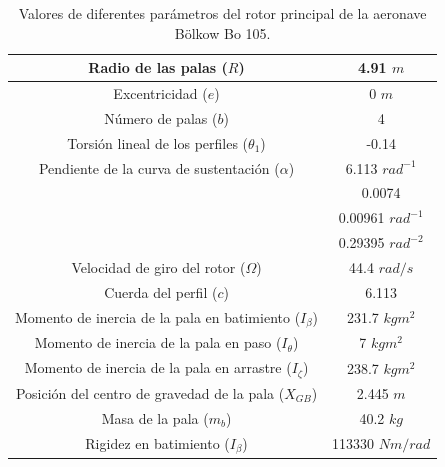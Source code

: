 \begin{table}[htbp]
	\centering
	\begin{tabular}{|>{\columncolor{Gray}}c|c|}
		\hline
		\cellcolor{Gray}Radio de las palas ($R$) & \cellcolor[rgb]{ 1,  1,  1}4.91 $m$ \\ \hline
		\cellcolor{Gray}Excentricidad ($e$)& \cellcolor[rgb]{ 1,  1,  1}0 $m$ \\ \hline
		\cellcolor{Gray}Número de palas ($b$) & \cellcolor[rgb]{ 1,  1,  1}4 \\ \hline
		\cellcolor{Gray}Torsión lineal de los perfiles ($\theta_1$) & \cellcolor[rgb]{ 1,  1,  1}-0.14 \\ \hline
		\cellcolor{Gray}Pendiente de la curva de sustentación ($\alpha$) & \cellcolor[rgb]{ 1,  1,  1}6.113 $rad^{-1}$ \\ \hline
		\cellcolor{Gray} & \cellcolor[rgb]{ 1,  1,  1}0.0074 \\ \hhline{|~|-|}
		\cellcolor{Gray} & \cellcolor[rgb]{ 1,  1,  1}0.00961 $rad^{-1}$ \\ \hhline{|~|-|}
		\multirow{-3}{*}{\cellcolor{Gray}Parámetros de la polar ($\delta_0$, $\delta_1$, $\delta_2$)} & \cellcolor[rgb]{ 1,  1,  1}0.29395 $rad^{-2}$ \\ \hline
		\cellcolor{Gray}Velocidad de giro del rotor ($\Omega$) & \cellcolor[rgb]{ 1,  1,  1}44.4 $rad/s$ \\ \hline
		\cellcolor{Gray}Cuerda del perfil ($c$) & \cellcolor[rgb]{ 1,  1,  1}6.113 \\ \hline
		\cellcolor{Gray}Momento de inercia de la pala en batimiento ($I_\beta$) & \cellcolor[rgb]{ 1,  1,  1}231.7 $kgm^2$ \\ \hline
		\cellcolor{Gray}Momento de inercia de la pala en paso ($I_\theta$) & \cellcolor[rgb]{ 1,  1,  1}7 $kgm^2$ \\ \hline
		\cellcolor{Gray}Momento de inercia de la pala en arrastre ($I_\zeta$) & \cellcolor[rgb]{ 1,  1,  1}238.7 $kgm^2$ \\ \hline
		\cellcolor{Gray}Posición del centro de gravedad de la pala ($X_{GB}$) & \cellcolor[rgb]{ 1,  1,  1}2.445 $m$ \\ \hline
		\cellcolor{Gray}Masa de la pala ($m_b$) & \cellcolor[rgb]{ 1,  1,  1}40.2 $kg$ \\ \hline
		\cellcolor{Gray}Rigidez en batimiento ($I_\beta$) & \cellcolor[rgb]{ 1,  1,  1}113330 $Nm/rad$ \\ \hline
	\end{tabular}%
	\caption{Valores de diferentes parámetros del rotor principal de la aeronave Bölkow Bo 105.}
	\label{RPBo}
\end{table}%

